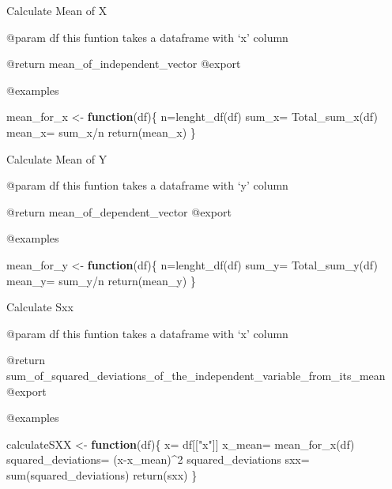 \documentclass[
]{article}
\newenvironment{Shaded}{\begin{snugshade}}{\end{snugshade}}
\newcommand{\ControlFlowTok}[1]{\textcolor[rgb]{0.13,0.29,0.53}{\textbf{#1}}}
\newcommand{\DecValTok}[1]{\textcolor[rgb]{0.00,0.00,0.81}{#1}}
\newcommand{\FunctionTok}[1]{\textcolor[rgb]{0.00,0.00,0.00}{#1}}
\newcommand{\NormalTok}[1]{#1}
\newcommand{\OtherTok}[1]{\textcolor[rgb]{0.56,0.35,0.01}{#1}}
\newcommand{\SpecialCharTok}[1]{\textcolor[rgb]{0.00,0.00,0.00}{#1}}
\newcommand{\StringTok}[1]{\textcolor[rgb]{0.31,0.60,0.02}{#1}}
\begin{document}
Calculate Mean of X

@param df this funtion takes a dataframe with `x' column

@return mean\_of\_independent\_vector @export

@examples

\begin{Shaded}
\begin{Highlighting}[]
\NormalTok{mean\_for\_x }\OtherTok{\textless{}{-}} \ControlFlowTok{function}\NormalTok{(df)\{}
\NormalTok{  n}\OtherTok{=}\FunctionTok{lenght\_df}\NormalTok{(df)}
\NormalTok{  sum\_x}\OtherTok{=} \FunctionTok{Total\_sum\_x}\NormalTok{(df)}
\NormalTok{  mean\_x}\OtherTok{=}\NormalTok{ sum\_x}\SpecialCharTok{/}\NormalTok{n}
  \FunctionTok{return}\NormalTok{(mean\_x)}
\NormalTok{\}}
\end{Highlighting}
\end{Shaded}

Calculate Mean of Y

@param df this funtion takes a dataframe with `y' column

@return mean\_of\_dependent\_vector @export

@examples

\begin{Shaded}
\begin{Highlighting}[]
\NormalTok{mean\_for\_y }\OtherTok{\textless{}{-}} \ControlFlowTok{function}\NormalTok{(df)\{}
\NormalTok{  n}\OtherTok{=}\FunctionTok{lenght\_df}\NormalTok{(df)}
\NormalTok{  sum\_y}\OtherTok{=} \FunctionTok{Total\_sum\_y}\NormalTok{(df)}
\NormalTok{  mean\_y}\OtherTok{=}\NormalTok{ sum\_y}\SpecialCharTok{/}\NormalTok{n}
  \FunctionTok{return}\NormalTok{(mean\_y)}
\NormalTok{\}}
\end{Highlighting}
\end{Shaded}

Calculate Sxx

@param df this funtion takes a dataframe with `x' column

@return
sum\_of\_squared\_deviations\_of\_the\_independent\_variable\_from\_its\_mean
@export

@examples

\begin{Shaded}
\begin{Highlighting}[]
\NormalTok{calculateSXX }\OtherTok{\textless{}{-}} \ControlFlowTok{function}\NormalTok{(df)\{}
\NormalTok{  x}\OtherTok{=}\NormalTok{ df[[}\StringTok{"x"}\NormalTok{]]}
\NormalTok{  x\_mean}\OtherTok{=} \FunctionTok{mean\_for\_x}\NormalTok{(df)}
\NormalTok{  squared\_deviations}\OtherTok{=}\NormalTok{ (x}\SpecialCharTok{{-}}\NormalTok{x\_mean)}\SpecialCharTok{\^{}}\DecValTok{2}
\NormalTok{  squared\_deviations}
\NormalTok{  sxx}\OtherTok{=} \FunctionTok{sum}\NormalTok{(squared\_deviations)}
  \FunctionTok{return}\NormalTok{(sxx)}
\NormalTok{\}}
\end{Highlighting}
\end{Shaded}
\end{document}
